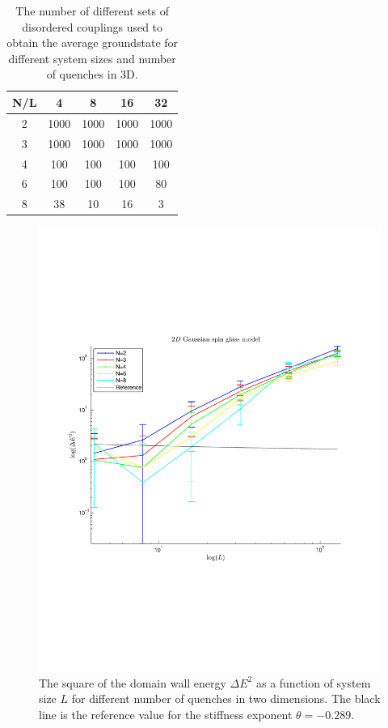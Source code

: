 \documentclass[paper=a4, fontsize=11pt]{scrartcl} %
\numberwithin{equation}{section} %
\numberwithin{figure}{section} %
\numberwithin{table}{section} %
\begin{document}
\begin{table}[h]
\centering
  \begin{tabular}{| c | c | c | c | c |}
    \hline
    N/L & 4 & 8 & 16 & 32 \\ \hline
	2 & 1000 & 1000 & 1000 & 1000 \\ \hline
	3 & 1000 & 1000 & 1000 & 1000 \\ \hline
	4 & 100 & 100 & 100 & 100 \\ \hline
	6 & 100 & 100 & 100 & 80 \\ \hline
	8 & 38 & 10 & 16 & 3 \\ \hline
  \end{tabular}
  \caption{The number of different sets of disordered couplings used to obtain the average groundstate for different system sizes and number of quenches in 3D.}
  \label{tab:couplings_3D}
\end{table}

\begin{figure}
\centering
\includegraphics[width=\textwidth]{images/spinglass2D_large.pdf}
\caption{The square of the domain wall energy $\Delta E ^ 2$ as a function of system size $L$ for different number of quenches in two dimensions. The black line is the reference value for the stiffness exponent $\theta=-0.289$.}
\label{fig:E_2D_large}
\end{figure}
\end{document}
